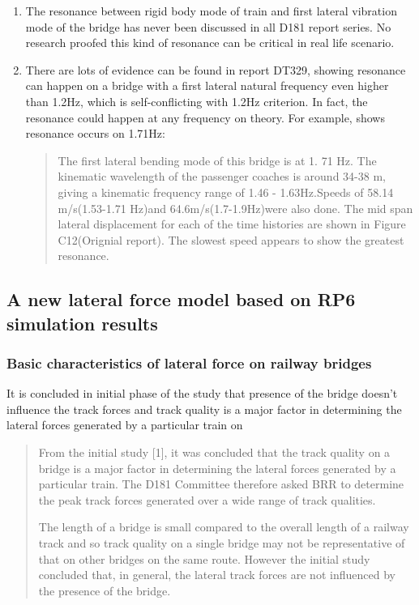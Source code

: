 \begin{enumerate} 
    \item The resonance between rigid body mode of train and first lateral vibration mode of the bridge has never been discussed in all D181 report series. No research proofed this kind of resonance can be critical in real life scenario.

    \item There are lots of evidence can be found in report DT329, showing resonance can happen on a bridge with a first lateral natural frequency even higher than 1.2Hz, which is self-conflicting with 1.2Hz criterion. In fact, the resonance could happen at any frequency on theory. For example, \citet[Page 14,Phase II]{d181dt329} shows resonance occurs on 1.71Hz:
        \begin{quote}
            The first lateral bending mode of this bridge is at 1. 71 Hz. The kinematic wavelength of the passenger coaches is around 34-38 m, giving a kinematic frequency range of 1.46 - 1.63Hz.Speeds of 58.14 m/s(1.53-1.71 Hz)and 64.6m/s(1.7-1.9Hz)were also done. The mid span lateral displacement for each of the time histories are shown in Figure C12(Orignial report). The slowest speed appears to show the greatest resonance.
        \end{quote}
\end{enumerate}

\subsection{A new lateral force model based on RP6 simulation results}\label{sec:lateralforce329}

\subsubsection{Basic characteristics of lateral force on railway bridges}
It is concluded in initial phase of the study that presence of the bridge doesn't influence the track forces and track quality is a major factor in determining the lateral forces generated by a particular train on \citet[Page 7, Secondary Phase]{d181dt329}



\begin{quote}
    From the initial study [1], it was concluded that the track quality on a bridge is a major factor in determining the lateral forces generated by a particular train. The D181 Committee therefore asked BRR to determine the peak track forces generated over a wide range of track qualities.

    The length of a bridge is small compared to the overall length of a railway track and so track quality on a single bridge may not be representative of that on other bridges on the same route. However the initial study concluded that, in general, the lateral track forces are not influenced by the presence of the bridge.
\end{quote}

